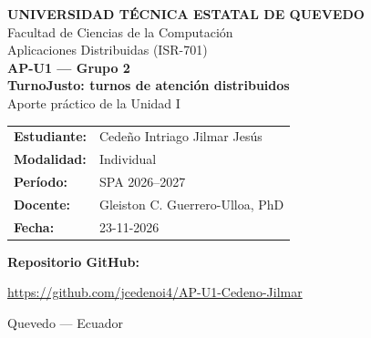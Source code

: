 \documentclass[12pt,a4paper]{article}
\begin{document}
\begin{center}
{\Large\bfseries UNIVERSIDAD TÉCNICA ESTATAL DE QUEVEDO}\\[0.4cm]
{\large Facultad de Ciencias de la Computación}\\[0.25cm]
{\large Aplicaciones Distribuidas (ISR-701)}\\[1.2cm]
{\Large\bfseries AP-U1 --- Grupo 2}\\[0.3cm]
{\LARGE\bfseries TurnoJusto: turnos de atención distribuidos}\\[0.5cm]
{\large Aporte práctico de la Unidad I}\\[1.2cm]
\end{center}
\renewcommand{\arraystretch}{1.65}
\noindent\begin{tabular}{@{}p{3.5cm}p{11cm}@{}}
\textbf{Estudiante:} & Cedeño Intriago Jilmar Jesús \\
\textbf{Modalidad:} & Individual \\
\textbf{Período:} & SPA 2026--2027 \\
\textbf{Docente:} & Gleiston C. Guerrero-Ulloa, PhD \\
\textbf{Fecha:} & 23-11-2026 \\
\end{tabular}

\vspace{0.45cm}
\noindent\textbf{Repositorio GitHub:}

\vspace{0.15cm}
\noindent\url{https://github.com/jcedenoi4/AP-U1-Cedeno-Jilmar}

\vfill
\begin{center}
Quevedo --- Ecuador
\end{center}
\end{document}
